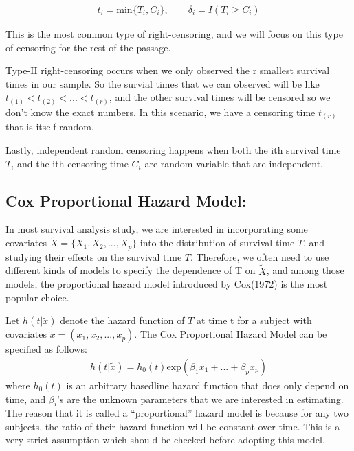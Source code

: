 \documentclass[]{article}
\begin{document}
\begin{equation}\begin{aligned}\label{eqn:transformed data}
t_i = \text{min}\{T_i,C_i \},  \qquad  \delta_i = I(T_i \geq C_i)
\end{aligned}\end{equation}

This is the most common type of right-censoring, and we will focus on
this type of censoring for the rest of the passage.

Type-II right-censoring occurs when we only observed the r smallest
survival times in our sample. So the survial times that we can observed
will be like \(t_{(1)}<t_{(2)}<...<t_{(r)}\), and the other survival
times will be censored so we don't know the exact numbers. In this
scenario, we have a censoring time \(t_{(r)}\) that is itself random.

Lastly, independent random censoring happens when both the ith survival
time \(T_i\) and the ith censoring time \(C_i\) are random variable that
are independent.

\hypertarget{cox-proportional-hazard-model}{%
\subsection{Cox Proportional Hazard
Model:}\label{cox-proportional-hazard-model}}

In most survival analysis study, we are interested in incorporating some
covariates \(\tilde{X} =\{X_1,X_2,...,X_p\}\) into the distribution of
survival time \(T\), and studying their effects on the survival time
\(T\). Therefore, we often need to use different kinds of models to
specify the dependence of T on \(\tilde{X}\), and among those models,
the proportional hazard model introduced by Cox(1972) is the most
popular choice.

Let \(h(t|\tilde{x})\) denote the hazard function of \(T\) at time t for
a subject with covariates \(\tilde{x} = (x_1,x_2,...,x_p)\). The Cox
Proportional Hazard Model can be specified as follows:
\begin{equation}\begin{aligned}\label{eqn:CoxHazardModel}
h(t|\tilde{x}) = h_0(t)\text{exp}(\beta_1x_1+...+\beta_px_p)
\end{aligned}\end{equation} where \(h_0(t)\) is an arbitrary basedline
hazard function that does only depend on time, and \(\beta_i\)'s are the
unknown parameters that we are interested in estimating. The reason that
it is called a ``proportional'' hazard model is because for any two
subjects, the ratio of their hazard function will be constant over time.
This is a very strict assumption which should be checked before adopting
this model.
\end{document}
